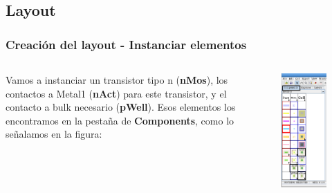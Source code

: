 \documentclass{beamer}
\begin{document}
\begin{frame}
\subsection{Layout}
\frametitle{Creación del layout - Instanciar elementos}
\begin{columns}[c]
Vamos a instanciar un transistor tipo n (\textbf{nMos}), los contactos a Metal1 (\textbf{nAct}) para este transistor, y el contacto a bulk necesario (\textbf{pWell}). Esos elementos los encontramos en la pestaña de \textbf{Components}, como lo señalamos en la figura:
\begin{figure}
  \includegraphics[width=0.69\linewidth]{figuras/edicionElectric-6bbb.png}
\end{figure}
\end{columns}
\end{frame}
\end{document}
